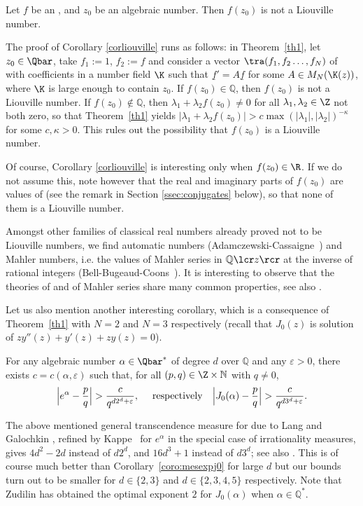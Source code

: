 \begin{coro} \label{corliouville}
Let $f$ be an \Efunction, and $z_0$ be an algebraic number. Then $f(z_0)$ is not a Liouville number.
\end{coro}
The proof of Corollary \ref{corliouville} runs as follows: in Theorem~\ref{th1}, let $z_0\in \Qbar$, take $f_1:=1$, $f_2:=f$ and consider a vector $\tra (f_1, f_2\ldots, f_N)$ of \Efunctions with coefficients in a number field $\K$ such that $\underline f '=A\underline f$ for some $A\in M_N(\K(z))$, where $\K$ is large enough to contain $z_0$. If $f(z_0)\in \mathbb Q$, then $f(z_0)$ is not a Liouville number.
If $f(z_0)\notin \mathbb Q$, then $\lambda_1+\lambda_2 f(z_0)\neq 0$ for all $\lambda_1, \lambda_2\in\Z$ not both zero, so that Theorem~\ref{th1} yields
$\vert \lambda_1+\lambda_2 f(z_0)\vert>c\max(\vert \lambda_1\vert, \vert \lambda_2\vert)^{-\kappa}$ for some $c,\kappa>0$. This rules out the possibility that $f(z_0)$ is a Liouville number.

Of course, Corollary \ref{corliouville} is interesting only when $f(z_0)\in\R$. If we do not assume this, note however that the real and imaginary parts of $f(z_0)$ are values of \Efunctions (see the remark in Section \ref{ssec:conjugates} below), so that none of them is a Liouville number.

Amongst other families of classical real numbers already proved not to be Liouville numbers, we find automatic numbers (Adamczewski-Cassaigne~\cite{ac}) and Mahler numbers, i.e. the values of Mahler series in $\mathbb Q\lcr z\rcr$ at the inverse of rational integers (Bell-Bugeaud-Coons~\cite{bbc}). It is interesting to observe that the theories of \Efunctions and of Mahler series share many common properties, see also \cite{AF}.

Let us also mention another interesting corollary, which is a consequence of Theorem~\ref{th1} with $N=2$ and $N=3$ respectively (recall that $J_0(z)$ is solution of $zy''(z)+y'(z)+zy(z)=0$).
\begin{coro} \label{coro:mesexpj0}
For any algebraic number $\alpha\in \Qbar^*$ of degree $d$ over $\mathbb Q$ and any $\varepsilon>0$, there exists $c=c(\alpha,\varepsilon)$ such that, for all $(p,q)\in \Z\times \mathbb N$ with $q\neq 0$,
\[
\Big \vert e^{\alpha}-\frac pq\Big\vert > \frac{c}{q^{d2^d+\varepsilon}},
\quad \textup{
respectively} \quad
\Big \vert J_0(\alpha)-\frac pq\Big\vert >\frac{c}{q^{d3^d+\varepsilon}}.
\]
\end{coro}
The above mentioned general transcendence measure for \Efunctions due to Lang and Galochkin \cite[p.\,238, Th.\,5.29 \& remarks]{EMS},
refined by Kappe~\cite{kappe} for $e^{\alpha}$ in the special case of irrationality measures, gives $4d^2-2d$ instead of $d2^d$, and $16d^3+1$ instead of $d3^d$; see also \cite[p.\,404]{Shidlovskiilivre}. This is of course much better than Corollary~\ref{coro:mesexpj0} for large $d$ but our bounds turn out to be smaller for $d\in \{2,3\}$ and $d\in \{2,3,4,5\}$ respectively. Note that Zudilin \cite{zudilin} has obtained the optimal exponent $2$ for $J_0(\alpha)$ when $\alpha \in \mathbb{Q}^*$.

